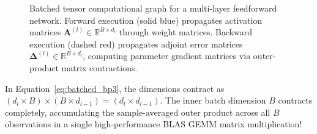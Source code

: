 \begin{figure}[H]
\caption{Batched tensor computational graph for a multi-layer feedforward network. Forward execution (solid blue) propagates activation matrices $\mathbf{A}^{(l)} \in \mathbb{R}^{B \times d_l}$ through weight matrices. Backward execution (dashed red) propagates adjoint error matrices $\boldsymbol{\Delta}^{(l)} \in \mathbb{R}^{B \times d_l}$, computing parameter gradient matrices via outer-product matrix contractions.}
\label{fig:batched_computational_graph}
\end{figure}

In Equation~\eqref{eq:batched_bp3}, the dimensions contract as $(d_l \times B) \times (B \times d_{l-1}) = (d_l \times d_{l-1})$. The inner batch dimension $B$ contracts completely, accumulating the sample-averaged outer product across all $B$ observations in a single high-performance BLAS GEMM matrix multiplication!

